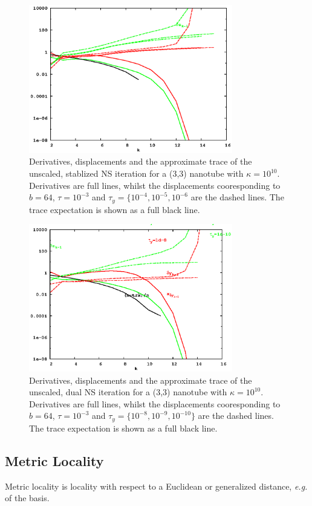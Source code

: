 \documentclass[letterpaper,twocolumn,amsmath,amsfont,amssymb,english,aps,jcp,preprintnumbers,groupaddress,nofootinbib,tightenlines]{revtex4}
\begin{document}
\begin{figure}[h]
\includegraphics[width=3.5in]{fig_wtrbx_100_noscaling/wtrbx_100_noscale_stab.eps}
\caption{Derivatives, displacements and the approximate trace of the unscaled, stablized NS iteration for a (3,3) 
nanotube with $\kappa =10^{10}$. 
Derivatives are full lines, whilst the displacements cooresponding to $b=64$, $\tau=10^{-3}$ and 
$\tau_y=\{10^{-4}, 10^{-5}, 10^{-6}$  are the dashed lines.  The trace expectation is shown as a full black line. }
\end{figure}


\begin{figure}[h]
\includegraphics[width=3.5in]{fig_wtrbx_100_noscaling/wtrbx_100_noscale_dual.eps}
\caption{Derivatives, displacements and the approximate trace of the unscaled, dual NS iteration for a (3,3) nanotube with $\kappa =10^{10}$. 
Derivatives are full lines, whilst the displacements cooresponding to $b=64$, $\tau=10^{-3}$ and $\tau_y=\{10^{-8}, 10^{-9}, 10^{-10}\}$  
are the dashed lines.  The trace expectation is shown as a full black line. }
\end{figure}

\subsection{Metric Locality} 
Metric locality is locality with respect to a Euclidean or generalized distance, {\em e.g.} of the basis.  
\end{document}
